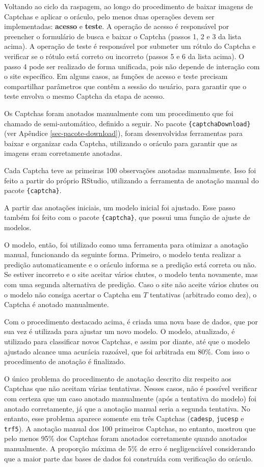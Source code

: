 \documentclass[12pt,twoside,brazilian]{book}
\begin{document}
Voltando ao ciclo da raspagem, ao longo do procedimento de baixar
imagens de Captchas e aplicar o oráculo, pelo menos duas operações devem
ser implementadas: \textbf{acesso} e \textbf{teste}. A operação de
acesso é responsável por preencher o formulário de busca e baixar o
Captcha (passos 1, 2 e 3 da lista acima). A operação de teste é
responsável por submeter um rótulo do Captcha e verificar se o rótulo
está correto ou incorreto (passos 5 e 6 da lista acima). O passo 4 pode
ser realizado de forma unificada, pois não depende de interação com o
site específico. Em alguns casos, as funções de acesso e teste precisam
compartilhar parâmetros que contêm a sessão do usuário, para garantir
que o teste envolva o mesmo Captcha da etapa de acesso.

Os Captchas foram anotados manualmente com um procedimento que foi
chamado de semi-automático, definido a seguir. No pacote
\texttt{\{captchaDownload\}} (ver Apêndice \ref{sec-pacote-download}),
foram desenvolvidas ferramentas para baixar e organizar cada Captcha,
utilizando o oráculo para garantir que as imagens eram corretamente
anotadas.

Cada Captcha teve as primeiras 100 observações anotadas manualmente.
Isso foi feito a partir do próprio RStudio, utilizando a ferramenta de
anotação manual do pacote \texttt{\{captcha\}}.

A partir das anotações iniciais, um modelo inicial foi ajustado. Esse
passo também foi feito com o pacote \texttt{\{captcha\}}, que possui uma
função de ajuste de modelos.

O modelo, então, foi utilizado como uma ferramenta para otimizar a
anotação manual, funcionando da seguinte forma. Primeiro, o modelo tenta
realizar a predição automaticamente e o oráculo informa se a predição
está correta ou não. Se estiver incorreto e o site aceitar vários
chutes, o modelo tenta novamente, mas com uma segunda alternativa de
predição. Caso o site não aceite vários chutes ou o modelo não consiga
acertar o Captcha em \(T\) tentativas (arbitrado como dez), o Captcha é
anotado manualmente.

Com o procedimento destacado acima, é criada uma nova base de dados, que
por sua vez é utilizada para ajustar um novo modelo. O modelo,
atualizado, é utilizado para classificar novos Captchas, e assim por
diante, até que o modelo ajustado alcance uma acurácia razoável, que foi
arbitrada em 80\%. Com isso o procedimento de anotação é finalizado.

O único problema do procedimento de anotação descrito diz respeito aos
Captchas que não aceitam várias tentativas. Nesses casos, não é possível
verificar com certeza que um caso anotado manualmente (após a tentativa
do modelo) foi anotado corretamente, já que a anotação manual seria a
segunda tentativa. No entanto, esse problema aparece somente em três
Captchas (\texttt{cadesp}, \texttt{jucesp} e \texttt{trf5}). A anotação
manual dos 100 primeiros Captchas, no entanto, mostrou que pelo menos
95\% dos Captchas foram anotados corretamente quando anotados
manualmente. A proporção máxima de 5\% de erro é negligenciável
considerando que a maior parte das bases de dados foi construída com
verificação do oráculo.
\end{document}
